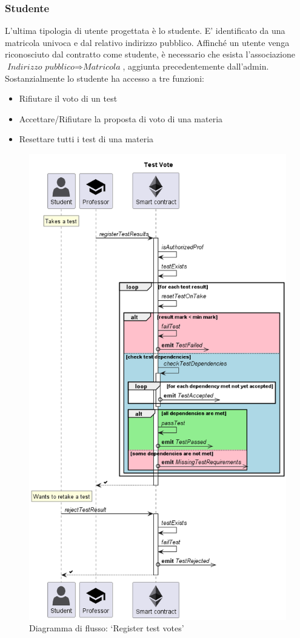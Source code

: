\pagebreak

\subsubsection{Studente}
L'ultima tipologia di utente progettata è lo studente. E' identificato da una matricola univoca e dal relativo indirizzo pubblico. Affinché un utente venga riconosciuto dal contratto come studente, è necessario che esista l'associazione $\textit{Indirizzo pubblico} \Rightarrow \textit{Matricola}$, aggiunta precedentemente dall'admin.
Sostanzialmente lo studente ha accesso a tre funzioni:
\begin{itemize}
    \item Rifiutare il voto di un test
    \item Accettare/Rifiutare la proposta di voto di una materia
    \item Resettare tutti i test di una materia
\end{itemize}



\begin{figure}
    \centering
    \includegraphics[width=0.75\columnwidth]{img/TestVote.png}
    \caption{Diagramma di flusso: `Register test votes'}
    \label{fig:registerTestVotes}
\end{figure}


